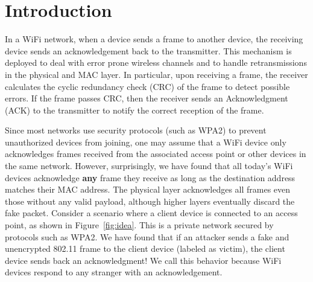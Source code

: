 \section{Introduction}

In a WiFi network, when a device sends a frame to another device,
the receiving device sends an acknowledgement back to the transmitter. This mechanism is deployed to deal with error prone wireless channels and to handle retransmissions in the physical and MAC layer. In particular, upon receiving a frame, the receiver calculates the cyclic redundancy check (CRC) of the frame to detect possible errors. If the frame passes CRC, then the receiver sends an Acknowledgment (ACK) to the transmitter to notify the correct reception of the frame.


Since most networks use security protocols (such as WPA2) to prevent unauthorized devices from joining, one may assume that a WiFi device only acknowledges frames received from the associated access point or other devices in the same network. 
However, surprisingly, we have found that all today's WiFi devices acknowledge \textbf{any} frame they receive as long as the destination address matches their MAC address. 
The physical layer acknowledges all frames even those without any valid payload, although higher layers eventually discard the fake packet.
Consider a scenario where a client device is connected to an access point, as shown in Figure~\ref{fig:idea}. This is a private network secured by protocols such as WPA2.
We have found that if an attacker sends a fake and unencrypted 802.11 frame to the client device (labeled as victim), the client device sends back an acknowledgment! We call this behavior \name because WiFi devices respond to any stranger with an acknowledgement. 


